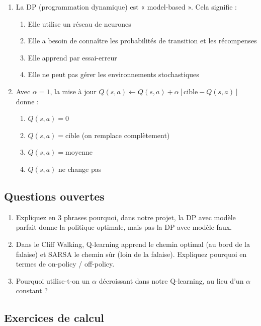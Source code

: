 \documentclass[11pt,a4paper]{article}
\begin{document}
\begin{enumerate}
\item La DP (programmation dynamique) est « model-based ». Cela signifie :
\begin{enumerate}[label=\alph*)]
  \item Elle utilise un réseau de neurones
  \item Elle a besoin de connaître les probabilités de transition et les récompenses
  \item Elle apprend par essai-erreur
  \item Elle ne peut pas gérer les environnements stochastiques
\end{enumerate}

\item Avec $\alpha = 1$, la mise à jour $Q(s,a) \leftarrow Q(s,a) + \alpha[\text{cible} - Q(s,a)]$ donne :
\begin{enumerate}[label=\alph*)]
  \item $Q(s,a) = 0$
  \item $Q(s,a) = \text{cible}$ (on remplace complètement)
  \item $Q(s,a) = \text{moyenne}$
  \item $Q(s,a)$ ne change pas
\end{enumerate}
\end{enumerate}

\subsection{Questions ouvertes}

\begin{enumerate}[resume]
\item Expliquez en 3 phrases pourquoi, dans notre projet, la DP avec modèle parfait donne la politique optimale, mais pas la DP avec modèle faux.

\item Dans le Cliff Walking, Q-learning apprend le chemin optimal (au bord de la falaise) et SARSA le chemin sûr (loin de la falaise). Expliquez pourquoi en termes de on-policy / off-policy.

\item Pourquoi utilise-t-on un $\alpha$ décroissant dans notre Q-learning, au lieu d'un $\alpha$ constant ?
\end{enumerate}

\subsection{Exercices de calcul}
\end{document}
